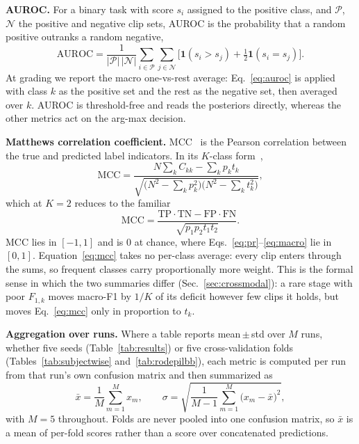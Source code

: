 \noindent\textbf{AUROC.}
For a binary task with score $s_i$ assigned to the positive class, and $\mathcal{P}$,
$\mathcal{N}$ the positive and negative clip sets, AUROC is the probability that a
random positive outranks a random negative,
\begin{equation}
\mathrm{AUROC}=\frac{1}{|\mathcal{P}|\,|\mathcal{N}|}
\sum_{i\in\mathcal{P}}\sum_{j\in\mathcal{N}}
\Big[\mathbf{1}(s_i{>}s_j)+\tfrac{1}{2}\mathbf{1}(s_i{=}s_j)\Big].
\label{eq:auroc}
\end{equation}
At grading we report the macro one-vs-rest average: Eq.~\eqref{eq:auroc} is applied
with class $k$ as the positive set and the rest as the negative set, then averaged
over $k$. AUROC is threshold-free and reads the posteriors directly, whereas the
other metrics act on the arg-max decision.

\noindent\textbf{Matthews correlation coefficient.}
MCC~\cite{matthews1975mcc} is the Pearson correlation between the true and predicted
label indicators. In its $K$-class form~\cite{gorodkin2004mcc},
\begin{equation}
\mathrm{MCC}=\frac{N\sum_k C_{kk}-\sum_k p_k t_k}
{\sqrt{\big(N^2-\sum_k p_k^2\big)\big(N^2-\sum_k t_k^2\big)}},
\label{eq:mcc}
\end{equation}
which at $K{=}2$ reduces to the familiar
\begin{equation}
\mathrm{MCC}=\frac{\mathrm{TP}\cdot\mathrm{TN}-\mathrm{FP}\cdot\mathrm{FN}}
{\sqrt{p_1p_2t_1t_2}}. \label{eq:mcc2}
\end{equation}
MCC lies in $[-1,1]$ and is $0$ at chance, where
Eqs.~\eqref{eq:pr}--\eqref{eq:macro} lie in $[0,1]$. Equation~\eqref{eq:mcc} takes
no per-class average: every clip enters through the sums, so frequent classes carry
proportionally more weight. This is the formal sense in which the two summaries
differ (Sec.~\ref{sec:crossmodal}): a rare stage with poor $F_{1,k}$ moves macro-F1
by $1/K$ of its deficit however few clips it holds, but moves
Eq.~\eqref{eq:mcc} only in proportion to $t_k$.

\noindent\textbf{Aggregation over runs.}
Where a table reports mean\,$\pm$\,std over $M$ runs, whether five seeds (Table~\ref{tab:results}) or five cross-validation folds (Tables~\ref{tab:subjectwise} and~\ref{tab:rodepilbb}), each metric is computed per
run from that run's own confusion matrix and then summarized as
\begin{equation}
\bar{x}=\frac{1}{M}\sum_{m=1}^{M}x_m,\qquad
\sigma=\sqrt{\frac{1}{M-1}\sum_{m=1}^{M}\big(x_m-\bar{x}\big)^{2}},
\label{eq:agg}
\end{equation}
with $M=5$ throughout. Folds are never pooled into one confusion matrix, so
$\bar{x}$ is a mean of per-fold scores rather than a score over concatenated
predictions.

